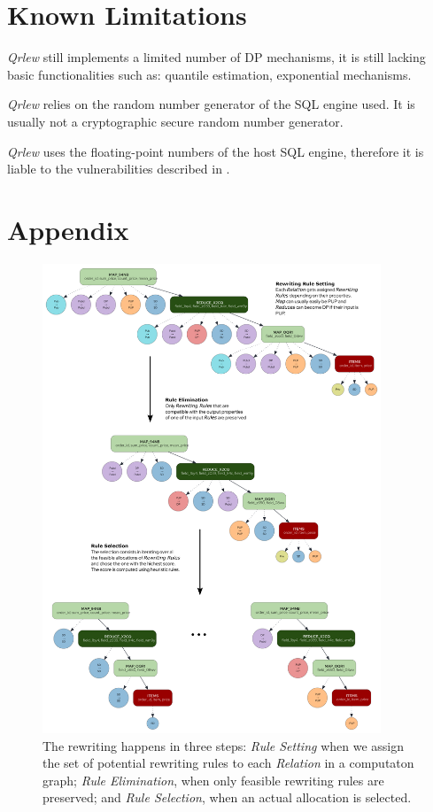\documentclass[letterpaper]{article} %
\newcommand{\qrlew}{\emph{Qrlew}}
\begin{document}
\section{Known Limitations}
\label{sec:limitations}

\qrlew{} still implements a limited number of DP mechanisms, it is still lacking basic functionalities such as: quantile estimation, exponential mechanisms.

\qrlew{} relies on the random number generator of the SQL engine used. It is usually not a cryptographic secure random number generator.

\qrlew{} uses the floating-point numbers of the host SQL engine, therefore it is liable to the vulnerabilities described in \cite{casacuberta2022widespread}.


\appendix

\section*{Appendix}

\begin{figure}[t]
    \centering
    \includegraphics[width=0.9\textwidth]{figures/set_eliminate_select} %
    \caption{The rewriting happens in three steps: \emph{Rule Setting} when we assign the set of potential rewriting rules to each \emph{Relation} in a computaton graph; \emph{Rule Elimination}, when only feasible rewriting rules are preserved; and \emph{Rule Selection}, when an actual allocation is selected.}
    \label{fig:set_eliminate_select}
\end{figure}
\end{document}
